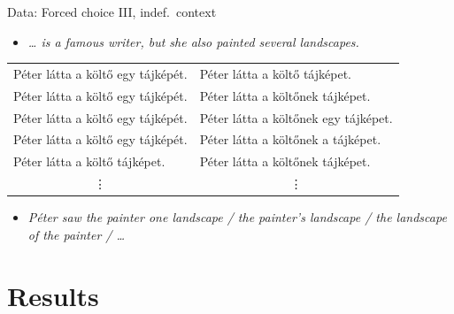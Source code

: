 \documentclass[12pt]{beamer}
\begin{document}
\begin{frame}{Data: Forced choice III, indef.\ context}

\begin{itemize}
    \item \emph{\dots{} is a famous writer, but she also painted \alert{several} landscapes.}
\end{itemize}

{\small
\hspace{-.5cm}\begin{tabulary}{1\linewidth}{ll}
Péter látta a költő \alert{egy} tájképét. & Péter látta a költő tájképet.\\
Péter látta a költő \alert{egy} tájképét. & Péter látta a költő\textcolor{red!70!black}{nek} tájképet.\\
Péter látta a költő \alert{egy} tájképét. & Péter látta a költő\textcolor{red!70!black}{nek} \alert{egy} tájképet.\\
Péter látta a költő \alert{egy} tájképét. & Péter látta a költő\textcolor{red!70!black}{nek} \textcolor{green!70!black}{a} tájképet.\\
Péter látta a költő tájképet.     & Péter látta a költő\textcolor{red!70!black}{nek} tájképet.\\
 & \\
\end{tabulary}
}

\begin{itemize}
    \item \emph{Péter saw the painter \alert{one} landscape / the painter's landscape / \textcolor{green!70!black}{the} landscape \textcolor{red!70!black}{of the} painter / \dots}
\end{itemize}

\end{frame}

\section{Results}
\end{document}
